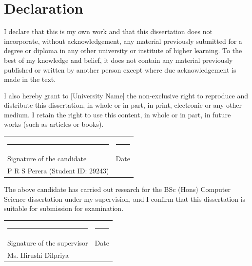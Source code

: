 \chapter*{Declaration}
\thispagestyle{plain}

I declare that this is my own work and that this dissertation does not incorporate, without acknowledgement, any material previously submitted for a degree or diploma in any other university or institute of higher learning. To the best of my knowledge and belief, it does not contain any material previously published or written by another person except where due acknowledgement is made in the text.

I also hereby grant to [University Name] the non-exclusive right to reproduce and distribute this dissertation, in whole or in part, in print, electronic or any other medium. I retain the right to use this content, in whole or in part, in future works (such as articles or books).

\vspace{1.5cm}
\noindent
\begin{tabular}{@{}p{}p{}@{}}
\rule{0.45\textwidth}{0.4pt} & \rule{0.28\textwidth}{0.4pt}\\
Signature of the candidate & Date\\
P R S Perera (Student ID: 29243) & \\
\end{tabular}

\vspace{2cm}
\noindent The above candidate has carried out research for the BSc (Hons) Computer Science dissertation under my supervision, and I confirm that this dissertation is suitable for submission for examination.

\vspace{1.5cm}
\noindent
\begin{tabular}{@{}p{}p{}@{}}
\rule{0.45\textwidth}{0.4pt} & \rule{0.28\textwidth}{0.4pt}\\
Signature of the supervisor & Date\\
Ms. Hirushi Dilpriya & \\
\end{tabular}

